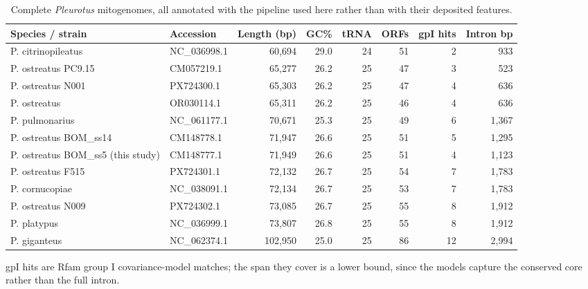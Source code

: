 \begin{table}[htbp]
\caption{Complete \textit{Pleurotus} mitogenomes, all annotated with the pipeline used here rather than with their deposited features.}\label{tab:comparative}
\footnotesize
\begin{tabular}{@{}llrrrrrr@{}}
\toprule
Species / strain & Accession & Length (bp) & GC\% & tRNA & ORFs & gpI hits & Intron bp \\
\midrule
P. citrinopileatus & NC\_036998.1 & 60,694 & 29.0 & 24 & 51 & 2 & 933 \\
P. ostreatus PC9.15 & CM057219.1 & 65,277 & 26.2 & 25 & 47 & 3 & 523 \\
P. ostreatus N001 & PX724300.1 & 65,303 & 26.2 & 25 & 47 & 4 & 636 \\
P. ostreatus & OR030114.1 & 65,311 & 26.2 & 25 & 46 & 4 & 636 \\
P. pulmonarius & NC\_061177.1 & 70,671 & 25.3 & 25 & 49 & 6 & 1,367 \\
P. ostreatus BOM\_ss14 & CM148778.1 & 71,947 & 26.6 & 25 & 51 & 5 & 1,295 \\
P. ostreatus BOM\_ss5 (this study) & CM148777.1 & 71,949 & 26.6 & 25 & 51 & 4 & 1,123 \\
P. ostreatus F515 & PX724301.1 & 72,132 & 26.7 & 25 & 54 & 7 & 1,783 \\
P. cornucopiae & NC\_038091.1 & 72,134 & 26.7 & 25 & 53 & 7 & 1,783 \\
P. ostreatus N009 & PX724302.1 & 73,085 & 26.7 & 25 & 55 & 8 & 1,912 \\
P. platypus & NC\_036999.1 & 73,807 & 26.8 & 25 & 55 & 8 & 1,912 \\
P. giganteus & NC\_062374.1 & 102,950 & 25.0 & 25 & 86 & 12 & 2,994 \\
\bottomrule
\end{tabular}
\begin{tablenotes}[flushleft]\footnotesize\item gpI hits are Rfam group I covariance-model matches; the span they cover is a lower bound, since the models capture the conserved core rather than the full intron.\end{tablenotes}
\end{table}
